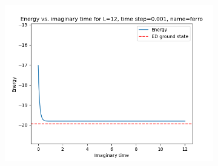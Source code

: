 \documentclass[12pt]{article}
\begin{document}
\begin{figure}
\begin{subfigure}{.5\textwidth}
  \includegraphics[width=\linewidth]{p4_1_energy_L_12time_step_0.001name_ferro.png}
  \label{fig:1c}
\end{subfigure}
\end{figure}
\end{document}
